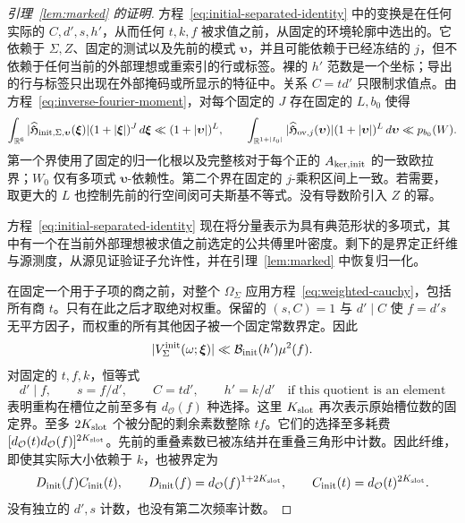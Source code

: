 \documentclass[11pt,a4paper]{article}
\numberwithin{equation}{section}
\numberwithin{figure}{section}
\theoremstyle{definition}
\theoremstyle{remark}
\begin{document}
\begin{proof}[引理~\ref{lem:marked} 的证明]
方程~\eqref{eq:initial-separated-identity} 中的变换是在任何实际的 \(C,d',s,h'\)，从而任何 \(t,k,f\) 被求值之前，从固定的环境轮廓中选出的。它依赖于 \(\Sigma,Z\)、固定的测试以及先前的模式 \(\boldsymbol\upsilon\)，并且可能依赖于已经冻结的 \(j\)，但不依赖于任何当前的外部理想或重索引的行或标签。裸的 \(h'\) 范数是一个坐标；导出的行与标签只出现在外部掩码或所显示的特征中。关系 \(C=td'\) 只限制求值点。由方程~\eqref{eq:inverse-fourier-moment}，对每个固定的 \(J\) 存在固定的 \(L,b_0\) 使得
\[
 \int_{\mathbb R^6}
 |\widehat{\mathfrak H}_{{\rm init},\Sigma,\boldsymbol\upsilon}
       (\boldsymbol\xi)|(1+|\boldsymbol\xi|)^J\,d\boldsymbol\xi
 \ll (1+|\boldsymbol\upsilon|)^L,\qquad
 \int_{\mathbb R^{1+|I_0|}}|\widehat{\mathfrak H}_{{\rm ov},j}(\boldsymbol\upsilon)|
       (1+|\boldsymbol\upsilon|)^L\,d\boldsymbol\upsilon
 \ll p_{b_0}(W).
\]
第一个界使用了固定的归一化根以及完整核对于每个正的 \(A_{{\rm ker},{\rm init}}\) 的一致欧拉界；\(W_0\) 仅有多项式 \(\boldsymbol\upsilon\)-依赖性。第二个界在固定的 \(j\)-乘积区间上一致。若需要，取更大的 \(L\) 也控制先前的行空间闵可夫斯基不等式。没有导数阶引入 \(Z\) 的幂。

方程~\eqref{eq:initial-separated-identity} 现在将分量表示为具有典范形状的多项式，其中有一个在当前外部理想被求值之前选定的公共傅里叶密度。剩下的是界定正纤维与源测度，从源见证验证子允许性，并在引理~\ref{lem:marked} 中恢复归一化。

在固定一个用于子项的商之前，对整个 \(\Omega_\Sigma\) 应用方程~\eqref{eq:weighted-cauchy}，包括所有商 \(t\)。只有在此之后才取绝对权重。保留的 \((s,C)=1\) 与 \(d'\mid C\) 使 \(f=d's\) 无平方因子，而权重的所有其他因子被一个固定常数界定。因此
\[
 |V_\Sigma^{\rm init}(\omega;\boldsymbol\xi)|
 \ll\mathcal B_{\rm init}(h')\mu^2(f).
\]
对固定的 \(t,f,k\)，恒等式
\[
 d'\mid f,\qquad s=f/d',\qquad C=td',\qquad h'=k/d'
       \quad\text{if this quotient is an element}
\]
表明重构在槽位之前至多有 \(d_{\mathcal O}(f)\) 种选择。这里 \(K_{\rm slot}\) 再次表示原始槽位数的固定界。至多 \(2K_{\rm slot}\) 个被分配的剩余素数整除 \(tf\)。它们的选择至多耗费 \([d_{\mathcal O}(t)d_{\mathcal O}(f)]^{2K_{\rm slot}}\)。先前的重叠素数已被冻结并在重叠三角形中计数。因此纤维，即使其实际大小依赖于 \(k\)，也被界定为
\begin{equation}\label{eq:initial-fibre}
 D_{\rm init}(f)C_{\rm init}(t),\qquad
 D_{\rm init}(f)=d_{\mathcal O}(f)^{1+2K_{\rm slot}},\qquad
 C_{\rm init}(t)=d_{\mathcal O}(t)^{2K_{\rm slot}}.
\end{equation}
没有独立的 \(d',s\) 计数，也没有第二次频率计数。


\end{proof}
\end{document}
